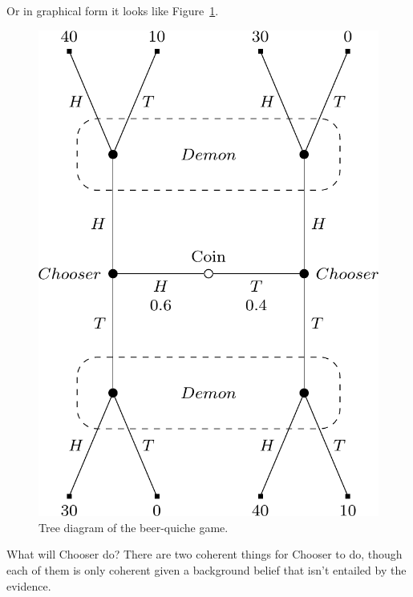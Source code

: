 \documentclass[
  12pt,
  letterpaper,
  DIV=11,
  numbers=noendperiod]{scrreprt}
\begin{document}
Or in graphical form it looks like Figure~\ref{fig-cho-kreps}.

\begin{figure}

{\centering \includegraphics{substantive_files/figure-pdf/fig-cho-kreps-1.png}

}

\caption{\label{fig-cho-kreps}Tree diagram of the beer-quiche game.}

\end{figure}

What will Chooser do? There are two coherent things for Chooser to do,
though each of them is only coherent given a background belief that
isn't entailed by the evidence.
\end{document}
